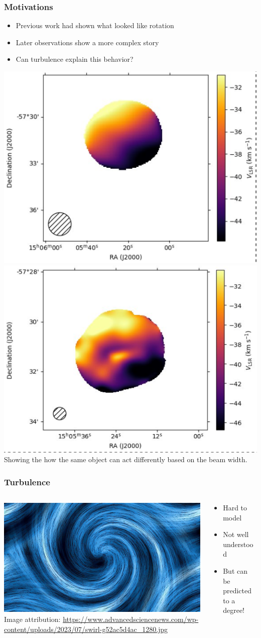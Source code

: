 \documentclass[aspectratio=169,compress]{beamer}
\newcommand\teeny{\fontsize{3pt}{3.6pt}\selectfont}
\begin{document}
\begin{frame}
  \frametitle{Motivations}
  \begin{itemize}
    \item Previous work had shown what looked like rotation
    \item Later observations show a more complex story
    \item Can turbulence explain this behavior?
  \end{itemize}
  \centering
  \vspace{3mm}
  \includegraphics[width=0.3\linewidth]{figures/bigrealVLSR.png}
  \includegraphics[width=0.3\linewidth]{figures/smallrealVLSR.png}
  {\teeny\\ Showing the how the same object can act differently based on the beam width.}

\end{frame}

\begin{frame}
  \frametitle{Turbulence}
  \begin{columns}
    \begin{column}{0.6\linewidth}
      \centering
      \includegraphics[width=0.8\linewidth]{figures/turbulence.jpg}\\
      {\teeny Image attribution: \url{https://www.advancedsciencenews.com/wp-content/uploads/2023/07/swirl-g52ac5d4ac_1280.jpg}}
    \end{column}
    \begin{column}{0.4\linewidth}
      \begin{itemize}
        \item Hard to model
        \item Not well understood
        \item But can be predicted to a degree!
      \end{itemize}
    \end{column}
  \end{columns}
\end{frame}
\end{document}
